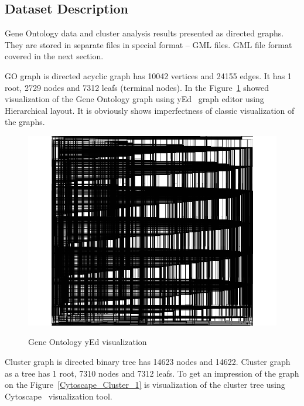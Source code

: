 \documentclass[a4paper,oneside]{article}
\begin{document}
\subsection{Dataset Description}
\label{dataset_description}
Gene Ontology data and cluster analysis results presented as directed graphs. They are stored in separate files in special format -- GML files. GML file format covered in the next section.


GO graph is directed acyclic graph has 10042 vertices and  24155 edges. It has 1 root, 2729 nodes and 7312 leafs (terminal nodes). In the Figure~\ref{yEd_GO} showed visualization of the Gene Ontology graph using yEd~\cite{yed} graph editor using Hierarchical layout. It is obviously shows imperfectness of classic visualization of the graphs.


\begin{figure}[h]
\begin{center}
	\includegraphics[scale=0.3]{pictures/yEd_GO.png}
	\label{yEd_GO}
	\caption{Gene Ontology yEd visualization}
\end{center}
\end{figure}


Cluster graph is directed binary  tree has 14623 nodes and 14622. Cluster graph as a tree has 1 root, 7310 nodes and 7312 leafs. To get an impression of the graph on the Figure~\ref{Cytoscape_Cluster_1} is visualization of the cluster tree using Cytoscape~\cite{Cytoscape} visualization tool.
\end{document}
